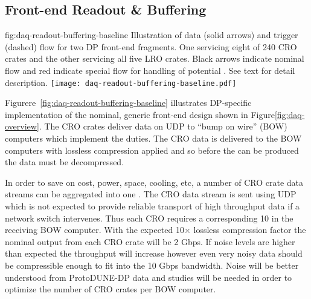 \subsection{Front-end Readout \& Buffering}
\label{sec:fd-daq-fero}


\begin{dunefigure}{fig:daq-readout-buffering-baseline}
  {Illustration of data (solid arrows) and trigger (dashed) flow for
    two DP front-end  fragments. 
    One servicing eight of 240 CRO crates and the other servicing all
    five LRO crates.  
    Black arrows indicate nominal flow and red indicate special flow
    for handling of potential . 
    See text for detail description.}
  \texttt{[image: daq-readout-buffering-baseline.pdf]}%
\end{dunefigure}

Figurere~\ref{fig:daq-readout-buffering-baseline} illustrates
DP-specific implementation of the nominal, generic  front-end
 design shown in Figure\ref{fig:daq-overview}. 
The CRO crates deliver data on UDP to ``bump on wire'' (BOW) computers
which implement the  duties.
The CRO data is delivered to the  BOW computers with lossless
compression applied and so before the  can be
produced the data must be decompressed. 

In order to save on cost, power, space, cooling, etc, a number of CRO
crate data streams can be aggregated into one . 
The CRO data stream is sent using UDP which is not expected to provide
reliable transport of high throughput data if a network switch
intervenes. 
Thus each CRO requires a corresponding \SI{10}{\Gbps}  in the receiving
BOW computer.
With the expected 10$\times$ lossless compression factor the nominal
output from each CRO crate will be 2 Gbps. 
If noise levels are higher than expected the throughput will increase
however even very noisy data should be compressible enough to fit into
the 10 Gbps bandwidth. 
Noise will be better understood from ProtoDUNE-DP data and studies
will be needed in order to optimize the number of CRO crates per BOW
computer.

